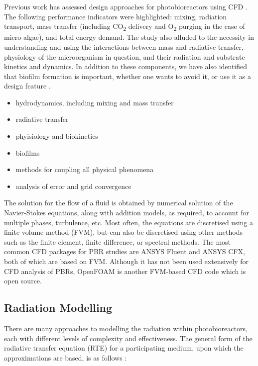 Previous work has assessed design approaches for photobioreactors using CFD \cite{posten2009}. The following performance indicators were highlighted: mixing, radiation transport, mass transfer (including CO\textsubscript{2} delivery and O\textsubscript{2} purging in the case of micro-algae), and total energy demand. The study also alluded to the necessity in understanding and using the interactions between mass and radiative transfer, physiology of the microorganism in question, and their radiation and substrate kinetics and dynamics. In addition to these components, we have also identified that biofilm formation is important, whether one wants to avoid it, or use it as a design feature \cite{castro2017}.

\begin{itemize}
\item hydrodynamics, including mixing and mass transfer
\item radiative transfer
\item phyisiology and biokinetics
\item biofilms
\item methods for coupling all physical phenomena
\item analysis of error and grid convergence
\end{itemize}

The solution for the flow of a fluid is obtained by numerical solution of the Navier-Stokes equations, along with addition models, as required, to account for multiple phases, turbulence, etc. Most often, the equations are discretised using a finite volume method (FVM), but can also be discretised using other methods such as the finite element, finite difference, or spectral methods.  The most common CFD packages for PBR studies are ANSYS Fluent and ANSYS CFX, both of which are based on FVM.  Although it has not been used extensively for CFD analysis of PBRs, OpenFOAM is another FVM-based CFD code which is open source.


\subsection{Radiation Modelling}
\label{S:radiation}
There are many approaches to modelling the radiation within photobioreactors, each with different levels of complexity and effectiveness. The general form of the radiative transfer equation (RTE) for a participating medium, upon which the approximations are based, is as follows \cite{modest2003}:

